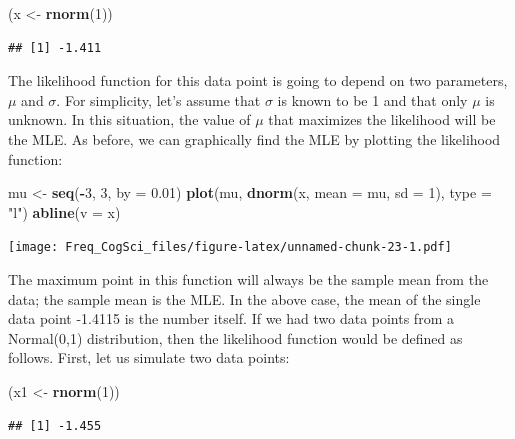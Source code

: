 \documentclass[12pt,]{krantz}
\newenvironment{Shaded}{\begin{snugshade}}{\end{snugshade}}
\newcommand{\DataTypeTok}[1]{\textcolor[rgb]{0.13,0.29,0.53}{#1}}
\newcommand{\DecValTok}[1]{\textcolor[rgb]{0.00,0.00,0.81}{#1}}
\newcommand{\FloatTok}[1]{\textcolor[rgb]{0.00,0.00,0.81}{#1}}
\newcommand{\KeywordTok}[1]{\textcolor[rgb]{0.13,0.29,0.53}{\textbf{#1}}}
\newcommand{\NormalTok}[1]{#1}
\newcommand{\OperatorTok}[1]{\textcolor[rgb]{0.81,0.36,0.00}{\textbf{#1}}}
\newcommand{\StringTok}[1]{\textcolor[rgb]{0.31,0.60,0.02}{#1}}
\begin{document}
\begin{Shaded}
\begin{Highlighting}[]
\NormalTok{(x <-}\StringTok{ }\KeywordTok{rnorm}\NormalTok{(}\DecValTok{1}\NormalTok{))}
\end{Highlighting}
\end{Shaded}

\begin{verbatim}
## [1] -1.411
\end{verbatim}

The likelihood function for this data point is going to depend on two parameters, \(\mu\) and \(\sigma\). For simplicity, let's assume that \(\sigma\) is known to be 1 and that only \(\mu\) is unknown. In this situation, the value of \(\mu\) that maximizes the likelihood will be the MLE. As before, we can graphically find the MLE by plotting the likelihood function:

\begin{Shaded}
\begin{Highlighting}[]
\NormalTok{mu <-}\StringTok{ }\KeywordTok{seq}\NormalTok{(}\OperatorTok{-}\DecValTok{3}\NormalTok{, }\DecValTok{3}\NormalTok{, }\DataTypeTok{by =} \FloatTok{0.01}\NormalTok{)}
\KeywordTok{plot}\NormalTok{(mu, }\KeywordTok{dnorm}\NormalTok{(x, }\DataTypeTok{mean =}\NormalTok{ mu, }\DataTypeTok{sd =} \DecValTok{1}\NormalTok{), }\DataTypeTok{type =} \StringTok{"l"}\NormalTok{)}
\KeywordTok{abline}\NormalTok{(}\DataTypeTok{v =}\NormalTok{ x)}
\end{Highlighting}
\end{Shaded}

\texttt{[image: Freq\_CogSci\_files/figure-latex/unnamed-chunk-23-1.pdf]}

The maximum point in this function will always be the sample mean from the data; the sample mean is the MLE. In the above case, the mean of the single data point -1.4115 is the number itself. If we had two data points from a Normal(0,1) distribution, then the likelihood function would be defined as follows. First, let us simulate two data points:

\begin{Shaded}
\begin{Highlighting}[]
\NormalTok{(x1 <-}\StringTok{ }\KeywordTok{rnorm}\NormalTok{(}\DecValTok{1}\NormalTok{))}
\end{Highlighting}
\end{Shaded}

\begin{verbatim}
## [1] -1.455
\end{verbatim}
\end{document}
